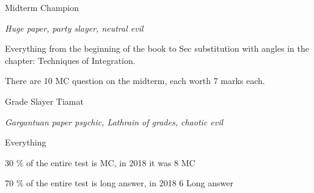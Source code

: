\documentclass[letterpaper,10pt,twoside,twocolumn,openany]{book}
\begin{document}
\begin{monsterbox}{Midterm Champion}
    \begin{hangingpar}
        \textit{Huge paper, party slayer, neutral evil}
    \end{hangingpar}
    \dndline
    \basics[
        armorclass = 35,
        hitpoints = 70,
        speed = {75 minutes},
    ]
    \dndline
    \stats[
        STR = \stat{27},
        DEX = \stat{10},
        CON = \stat{25},
        INT = \stat{16},
        WIS = \stat{13},
        CHA = \stat{21},
    ]
    \dndline
    \details[
        damageimmunities = {Calculator, Smartphones, any calculating devices},
        languages = {Algebra, Integration, Derivative},
        challenge = {17},
    ]
    \dndline
    Everything from the beginning of the book to Sec substitution with angles in the chapter: Techniques of Integration. 
    \begin{monsteraction}
        There are 10 MC question on the midterm, each worth 7 marks each.
    \end{monsteraction}    
\end{monsterbox}

\begin{monsterbox}{Grade Slayer Tiamat}
    \begin{hangingpar}
        \textit{Gargantuan paper psychic, Lathrain of grades, chaotic evil}
    \end{hangingpar}
    \dndline
    \basics[
        armorclass = 55,
        hitpoints = N > 0,
        speed = {120 minutes},
    ]
    \dndline
    \stats[
        STR = \stat{30},
        DEX = \stat{10},
        CON = \stat{30},
        INT = \stat{26},
        WIS = \stat{26},
        CHA = \stat{28},
    ]
    \dndline
    \details[
        damageimmunities = {Calculator, Smartphones, any calculating devices},
        languages = {Algebra, Integration, Derivative},
        challenge = {30},
    ]
    \dndline
    Everything 
    \begin{monsteraction}
        30 \% of the entire test is MC, in 2018 it was 8 MC
    \end{monsteraction} 
    \begin{monsteraction}
        70 \% of the entire test is long answer, in 2018 6 Long answer
    \end{monsteraction} 
\end{monsterbox}
\end{document}
